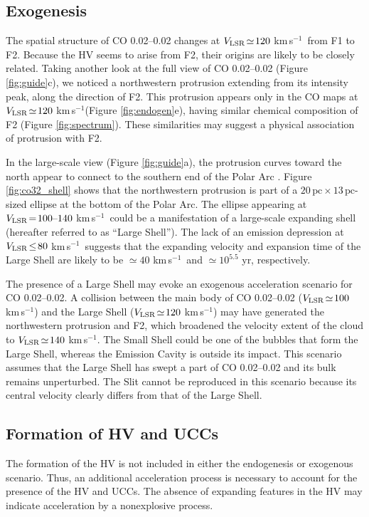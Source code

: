 \documentclass[twocolumn]{aastex631}
\newcommand\kms{\hbox{km$\,$s$^{-1}$}}
\newcommand\VLSR{\hbox{$V_{\rm LSR}$}}
\begin{document}
\subsection{Exogenesis}
The spatial structure of CO 0.02--0.02 changes at $\VLSR\!\simeq\! 120$ \kms\ from F1 to F2. Because the HV seems to arise from F2, their origins are likely to be closely related. Taking another look at the full view of CO 0.02--0.02 (Figure \ref{fig:guide}c), we noticed a northwestern protrusion extending from its intensity peak, along the direction of F2. This protrusion appears only in the CO maps \citep{Oka99} at $\VLSR\!\simeq\! 120$ \kms (Figure \ref{fig:endogen}e), having similar chemical composition of F2 (Figure \ref{fig:spectrum}). These similarities may suggest a physical association of protrusion with F2.

In the large-scale view (Figure \ref{fig:guide}a), the protrusion curves toward the north appear to connect to the southern end of the Polar Arc \citep{Bally88}. Figure \ref{fig:co32_shell} shows that the northwestern protrusion is part of a $20\,\mbox{pc}\times\! 13\,\mbox{pc}$-sized ellipse at the bottom of the Polar Arc. The ellipse appearing at $\VLSR\!=\! 100\mbox{--}140$ \kms\ could be a manifestation of a large-scale expanding shell (hereafter referred to as ``Large Shell''). The lack of an emission depression at $\VLSR\!\leq\! 80$ \kms\ suggests that the expanding velocity and expansion time of the Large Shell are likely to be $\simeq\! 40$ \kms\ and $\simeq\! 10^{5.5}$ yr, respectively.

The presence of a Large Shell may evoke an exogenous acceleration scenario for CO 0.02--0.02. A collision between the main body of CO 0.02--0.02 ($\VLSR\!\simeq\! 100$ \kms ) and the Large Shell ($\VLSR\!\simeq\! 120$ \kms ) may have generated the northwestern protrusion and F2, which broadened the velocity extent of the cloud to $\VLSR\!\simeq\! 140$ \kms . The Small Shell could be one of the bubbles that form the Large Shell, whereas the Emission Cavity is outside its impact. This scenario assumes that the Large Shell has swept a part of CO 0.02--0.02 and its bulk remains unperturbed. The Slit cannot be reproduced in this scenario because its central velocity clearly differs from that of the Large Shell.  


\subsection{Formation of HV and UCCs}
The formation of the HV is not included in either the endogenesis or exogenous scenario. Thus, an additional acceleration process is necessary to account for the presence of the HV and UCCs. The absence of expanding features in the HV may indicate acceleration by a nonexplosive process.  
\end{document}
